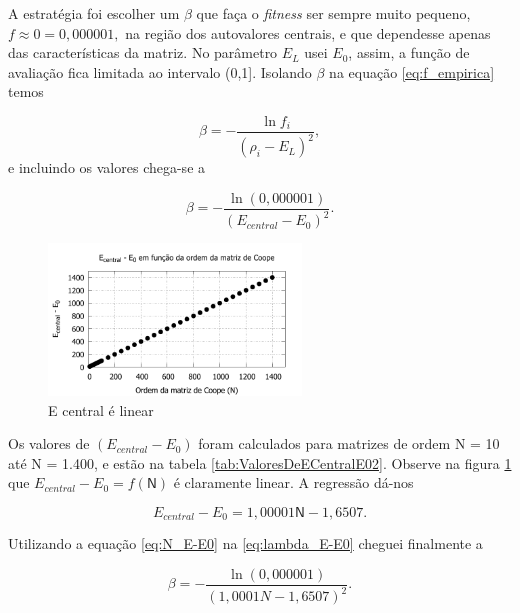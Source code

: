 	A estratégia foi escolher um $\beta$ que faça o \emph{fitness} ser sempre muito pequeno, $f \approx 0 = 0,000001,$ na região dos autovalores centrais, e que dependesse apenas das características da matriz. No parâmetro $E_L$ usei $E_0$, assim, a função de avaliação fica limitada ao intervalo (0,1]. Isolando $\beta$ na equação \ref{eq:f_empirica} temos
	
	\begin{equation}
				\beta = - \frac{\ln f_i}{(\rho_i - E_L)^2},
	\end{equation}
	e incluindo os valores chega-se a
	
	\begin{equation}\label{eq:lambda_E-E0}
				\beta = - \frac{\ln(0,000001)}{(E_{central} - E_0)^2}.
	\end{equation}
	
	\begin{figure}
		\centering
			\includegraphics[width=0.60\textwidth]{figs/resultados/precisaoFitness/E-central_eE0_funcao_N.pdf}
		\caption{E central é linear}
		\label{fig:E-central_eE0_funcao_N}
	\end{figure}
	
	Os valores de $(E_{central} - E_0)$ foram calculados para matrizes de ordem N = 10 até N = 1.400, e estão na tabela \ref{tab:ValoresDeECentralE02}. Observe na figura \ref{fig:E-central_eE0_funcao_N} que $E_{central} - E_0 = f(\mathsf{N})$ é claramente linear. A regressão dá-nos
	
	\begin{equation}\label{eq:N_E-E0}
			E_{central} - E_0 = 1,00001\mathsf{N} - 1,6507.
	\end{equation}
	
	Utilizando a equação \ref{eq:N_E-E0} na \ref{eq:lambda_E-E0} cheguei finalmente a
	
	\begin{equation}\label{eq:lambda_N}
		\beta = - \frac{\ln(0,000001)}{(1,0001N - 1,6507)^2}.
	\end{equation}
		
